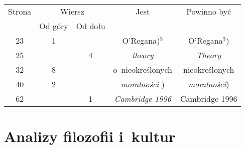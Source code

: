 \documentclass[a4paper,11pt]{article}
\begin{document}
\begin{center}

  \begin{tabular}{|c|c|c|c|c|}
    \hline
    Strona & \multicolumn{2}{c|}{Wiersz} & Jest
                              & Powinno być \\ \cline{2-3}
    & Od góry & Od dołu & & \\
    \hline
    23  &  1 & & O’Regana)$^{ 3 }$ & O’Regana$^{ 3 }$) \\
    25  & &  4 & \textit{theory} & \textit{Theory} \\
    32  &  8 & & o~nieokreślonych & nieokreślonych \\
    40  &  2 & & \textit{moralności} ) & \textit{moralności}) \\
    62  & &  1 & \textit{Cambridge 1996} & Cambridge 1996  \\
    \hline
  \end{tabular}

\end{center}

\vspace{\spaceTwo}













\newpage

\section{Analizy filozofii i~kultur}

\vspace{\spaceTwo}




\vspace{0em}
\end{document}
